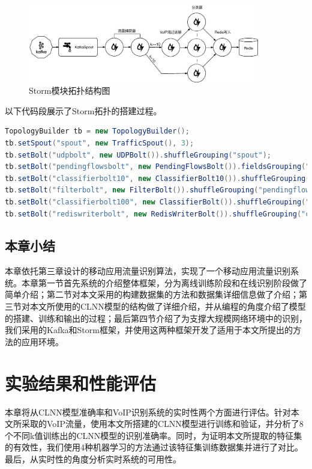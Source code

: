 \begin{figure}[htp]
\begin{center}
\includegraphics[width=0.9\textwidth]{figures/storm.eps}
\caption{Storm模块拓扑结构图}\label{fig:storm}
\end{center}
\end{figure}
以下代码段展示了Storm拓扑的搭建过程。
\begin{lstlisting}[breaklines=true,language={Java},frame=single,basicstyle=\small\monaco,label={lst:storm},
keywordstyle=\color{blue!70},
rulesepcolor=\color{red!20!green!20!blue!20},escapeinside=``,
xleftmargin=1.5em,xrightmargin=1.5em, aboveskip=1em]  
TopologyBuilder tb = new TopologyBuilder();
tb.setSpout("spout", new TrafficSpout(), 3);
tb.setBolt("udpbolt", new UDPBolt()).shuffleGrouping("spout");
tb.setBolt("pendingflowsbolt", new PendingFlowsBolt()).fieldsGrouping("udpbolt", new Fields("key"));
tb.setBolt("classifierbolt10", new ClassifierBolt10()).shuffleGrouping("pendingflowsbolt", "10");
tb.setBolt("filterbolt", new FilterBolt()).shuffleGrouping("pendingflowsbolt", "100");
tb.setBolt("classifierbolt100", new ClassifierBolt()).shuffleGrouping("filterbolt");
tb.setBolt("rediswriterbolt", new RedisWriterBolt()).shuffleGrouping("classifierbolt10").shuffleGrouping("classifierbolt100");
\end{lstlisting}  

\section{本章小结}
本章依托第三章设计的移动应用流量识别算法，实现了一个移动应用流量识别系统。本章第一节首先系统的介绍整体框架，分为离线训练阶段和在线识别阶段做了简单介绍；第二节对本文采用的构建数据集的方法和数据集详细信息做了介绍；第三节对本文所使用的CLNN模型的结构做了详细介绍，并从编程的角度介绍了模型的搭建、训练和输出的过程；最后第四节介绍了为支撑大规模网络环境中的识别，我们采用的Kafka和Storm框架，并使用这两种框架开发了适用于本文所提出的方法的应用环境。



\chapter{实验结果和性能评估}
本章将从CLNN模型准确率和VoIP识别系统的实时性两个方面进行评估。针对本文所采取的VoIP流量，使用本文所搭建的CLNN模型进行训练和验证，并分析了8个不同k值训练出的CLNN模型的识别准确率。同时，为证明本文所提取的特征集的有效性，我们使用4种机器学习的方法通过该特征集训练数据集并进行了对比。最后，从实时性的角度分析实时系统的可用性。

